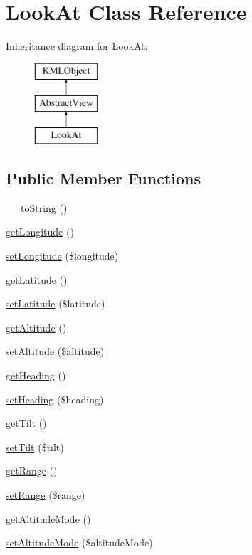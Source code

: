 \hypertarget{classLookAt}{
\section{LookAt Class Reference}
\label{d0/d01/classLookAt}
}
Inheritance diagram for LookAt:\begin{figure}[H]
\begin{center}
\leavevmode
\includegraphics[height=3.000000cm]{d0/d01/classLookAt}
\end{center}
\end{figure}
\subsection*{Public Member Functions}
\begin{DoxyCompactItemize}
\item 
\hyperlink{classLookAt_aa3a4bf7c8180054f9f20a8ce6ca2aac7}{\_\-\_\-toString} ()
\item 
\hyperlink{classLookAt_a8375fa12ce23c8080da991bbee1ee00c}{getLongitude} ()
\item 
\hyperlink{classLookAt_aee0b3a254140aeb83f84a8e12aef333d}{setLongitude} (\$longitude)
\item 
\hyperlink{classLookAt_ac6a164c3b31cc442ad38ea847f136f30}{getLatitude} ()
\item 
\hyperlink{classLookAt_aec4035f2805b28fed92b5c66da6cf96a}{setLatitude} (\$latitude)
\item 
\hyperlink{classLookAt_ae7d07349dd4113390b74b3dafe98f2a7}{getAltitude} ()
\item 
\hyperlink{classLookAt_a152fe18c30df270bbb0be9f262bd278f}{setAltitude} (\$altitude)
\item 
\hyperlink{classLookAt_ad74916fa34cce353e8f32dd4688ae2eb}{getHeading} ()
\item 
\hyperlink{classLookAt_aac318f1220cf8fb948d1a421b03c80de}{setHeading} (\$heading)
\item 
\hyperlink{classLookAt_a2756638ae3f5ba0ec092e10d6aa552f9}{getTilt} ()
\item 
\hyperlink{classLookAt_a11c6fb76fd13cb5c0a5b41b3264eec6a}{setTilt} (\$tilt)
\item 
\hyperlink{classLookAt_a93906bd7eed5674e2a01d5c6f4f82e8f}{getRange} ()
\item 
\hyperlink{classLookAt_ab229ee1f9bd94308a0465cea743d98b3}{setRange} (\$range)
\item 
\hyperlink{classLookAt_ab7969bb0dc08c4dd32131403dc27a188}{getAltitudeMode} ()
\item 
\hyperlink{classLookAt_a6c482bbece1ab84b0a266fc94f77f149}{setAltitudeMode} (\$altitudeMode)
\end{DoxyCompactItemize}


